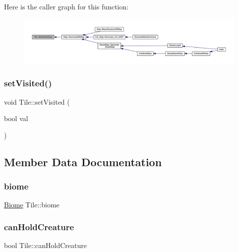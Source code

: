 Here is the caller graph for this function\+:
\nopagebreak
\begin{figure}[H]
\begin{center}
\leavevmode
\includegraphics[width=350pt]{df/d79/class_tile_ae04b87313b96914391ca2ffc2eb9f5c1_icgraph}
\end{center}
\end{figure}
\mbox{\label{class_tile_a72c64bbb075c641ed1af3b4d669d39ea}} 
\subsubsection{\texorpdfstring{set\+Visited()}{setVisited()}}
{\footnotesize\ttfamily void Tile\+::set\+Visited (\begin{DoxyParamCaption}\item[{bool}]{val }\end{DoxyParamCaption})}



\subsection{Member Data Documentation}
\mbox{\label{class_tile_aaaecf4c66080aa56274a50e6a1e3507f}} 
\subsubsection{\texorpdfstring{biome}{biome}}
{\footnotesize\ttfamily \mbox{\hyperlink{class_biome}{Biome}} Tile\+::biome\hspace{0.3cm}{\ttfamily [private]}}

\mbox{\label{class_tile_acacf4fe2349698e47f060d5301f7ba93}} 
\subsubsection{\texorpdfstring{can\+Hold\+Creature}{canHoldCreature}}
{\footnotesize\ttfamily bool Tile\+::can\+Hold\+Creature\hspace{0.3cm}{\ttfamily [private]}}


